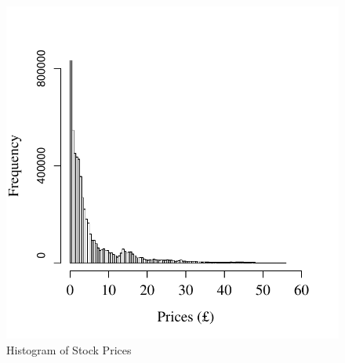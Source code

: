 \appendix

\begin{figure}%
	\centering%
	\caption{Histogram of Stock Prices}%
	\label{fig:histogram_prices}%
	\includegraphics[width=.6\textwidth]{figures/prices_hist_login_days.pdf}
\end{figure}

\clearpage

